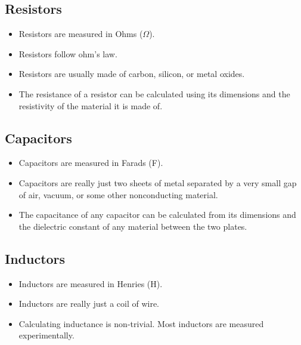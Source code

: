 \documentclass[letterpaper, 12pt]{article}
\begin{document}
\subsection*{Resistors}
\begin{itemize}
	\item Resistors are measured in Ohms ($\Omega$). 
	\item Resistors follow ohm's law.
	\item Resistors are usually made of carbon, silicon, or metal oxides.  
	\item The resistance of a resistor can be calculated using its dimensions and the resistivity of the material it is made of.
	
\end{itemize}

\subsection*{Capacitors}
\begin{itemize}
	\item Capacitors are measured in Farads (F).
	\item Capacitors are really just two sheets of metal separated by a very small gap of air, vacuum, or some other nonconducting material.
	\item The capacitance of any capacitor can be calculated from its dimensions and the dielectric constant of any material between the two plates.
	
\end{itemize}

\subsection*{Inductors}
\begin{itemize}
	\item Inductors are measured in Henries (H).
	\item Inductors are really just a coil of wire.  
	\item Calculating inductance is non-trivial.  Most inductors are measured experimentally.	
\end{itemize}
\end{document}
